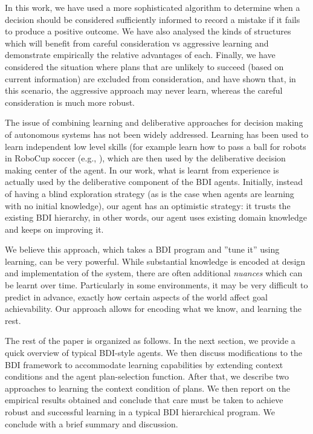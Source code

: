 In this work, we have used a more sophisticated algorithm to determine
when a decision should be considered sufficiently informed to record a
mistake if it fails to produce a positive outcome. We have also
analysed the kinds of structures which will benefit from careful
consideration vs aggressive learning and demonstrate empirically the
relative advantages of each. 
%
Finally, we have considered the situation where
plans that are unlikely to succeed (based on current information) are
excluded from consideration, and have shown that, in this scenario, the
aggressive approach may never learn, whereas the careful consideration
is much more robust.



The issue of combining learning and deliberative approaches for decision
making of autonomous systems has not been widely addressed. Learning
has been used to learn independent low level skills (for example learn
how to pass a ball for robots in RoboCup soccer (e.g., \cite{Riedmiller01}), which are
then used by the deliberative decision making center of the agent.  In
our work, what is learnt from experience is actually used by the
deliberative component of the BDI agents. Initially, instead of having
a blind exploration strategy 
(as is the case when agents are learning with no initial knowledge), 
our agent has an optimistic strategy: it trusts the existing BDI hierarchy, in other
words, our agent uses existing domain knowledge and keeps on improving
it.


We believe this approach, which takes a BDI program and 
''tune it'' using learning, can be very powerful. While substantial
knowledge is encoded at design and implementation of the system, there
are often additional \textit{nuances} which can be learnt over
time. Particularly in some environments, it may be very difficult to
predict in advance, exactly how certain aspects of the world affect
goal achievability. Our approach allows for encoding what we know,
and learning the rest.



The rest of the paper is organized as follows. In the next section, we
provide a quick overview of typical BDI-style agents.
%
We then discuss modifications to the BDI framework to accommodate learning capabilities by
extending context conditions and the agent plan-selection function. 
%
After that, we describe two approaches to learning the context condition of plans.
%
We then report on the empirical results obtained and conclude that care must be taken to
achieve robust and successful learning in a typical BDI hierarchical program. 
%
We conclude with a brief summary and discussion.

